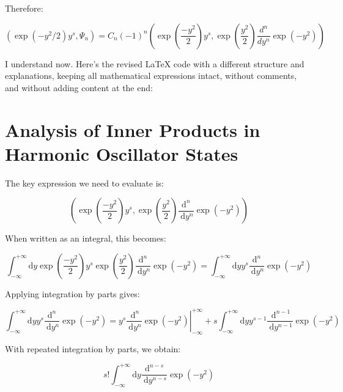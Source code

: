 \documentclass[italian]{HKNdocument}
\begin{document}
Therefore:

\begin{equation*}
\left(\exp\left(-y^2/2\right)y^s, \Psi_n\right) = C_n(-1)^n\left(\exp\left(\frac{-y^2}{2}\right)y^s, \exp\left(\frac{y^2}{2}\right)\frac{d^n}{dy^n}\exp(-y^2)\right) \tag{5.69}
\end{equation*}

I understand now. Here's the revised LaTeX code with a different structure and explanations, keeping all mathematical expressions intact, without comments, and without adding content at the end:


\section*{Analysis of Inner Products in Harmonic Oscillator States}

The key expression we need to evaluate is:

\begin{equation*}
\left(\exp \left(\frac{-y^{2}}{2}\right) y^{s}, \exp \left(\frac{y^{2}}{2}\right) \frac{\mathrm{d}^{n}}{\mathrm{~d} y^{n}} \exp \left(-y^{2}\right)\right) \tag{5.70}
\end{equation*}

When written as an integral, this becomes:

\begin{equation*}
\int_{-\infty}^{+\infty} \mathrm{d} y \exp \left(\frac{-y^{2}}{2}\right) y^{s} \exp \left(\frac{y^{2}}{2}\right) \frac{\mathrm{d}^{n}}{\mathrm{~d} y^{n}} \exp \left(-y^{2}\right)=\int_{-\infty}^{+\infty} \mathrm{d} y y^{s} \frac{\mathrm{d}^{n}}{\mathrm{~d} y^{n}} \exp \left(-y^{2}\right) \tag{5.71}
\end{equation*}

Applying integration by parts gives:

\begin{equation*}
\int_{-\infty}^{+\infty} \mathrm{d} y y^{s} \frac{\mathrm{d}^{n}}{\mathrm{~d} y^{n}} \exp \left(-y^{2}\right)=\left.y^{s} \frac{\mathrm{~d}^{n}}{\mathrm{~d} y^{n}} \exp \left(-y^{2}\right)\right|_{-\infty} ^{+\infty}+s \int_{-\infty}^{+\infty} \mathrm{d} y y^{s-1} \frac{\mathrm{~d}^{n-1}}{\mathrm{~d} y^{n-1}} \exp \left(-y^{2}\right) \tag{5.72}
\end{equation*}

With repeated integration by parts, we obtain:

\begin{equation*}
s!\int_{-\infty}^{+\infty} \mathrm{d} y \frac{\mathrm{d}^{n-s}}{\mathrm{~d} y^{n-s}} \exp \left(-y^{2}\right) \tag{5.73}
\end{equation*}
\end{document}
